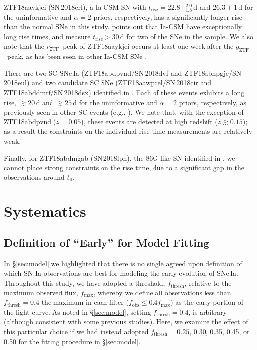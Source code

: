 \documentclass[twocolumn]{./aastex63}
\newcommand{\rztf}{$r_\mathrm{ZTF}$}
\newcommand{\gztf}{$g_\mathrm{ZTF}$}
\newcommand{\tfl}{$t_\mathrm{fl}$}
\newcommand{\trise}{$t_\mathrm{rise}$}
\begin{document}
ZTF18aaykjei (SN\,2018crl), a Ia-CSM SN with \trise$ = 22.8
\pm^{2.0}_{1.8}$\,d and $26.3 \pm 1$\,d for the uninformative and $\alpha = 2$
priors, respectively, has a significantly longer rise than the normal SNe in
this study. \citet{Silverman13} points out that Ia-CSM have exceptionally long
rise times, and \citet{Firth15} measure \trise$ > 30$\,d for two of the SNe in
the \citet{Silverman13} sample. We also note that the \rztf\ peak of
ZTF18aaykjei occurs at least one week after the \gztf\ peak, as has been seen
in other Ia-CSM SNe \citep{aldering05gj,prieto05gj}.

There are two SC SNe\,Ia (ZTF18abdpvnd/SN\,2018dvf and
ZTF18abhpgje/SN\,2018eul) and two candidate SC SNe (ZTF18aawpcel/SN\,2018cir
and ZTF18abddmrf/SN\,2018dsx) identified in \citet{Yao19}. Each of these
events exhibits a long rise, $\gtrsim 20$\,d and $\gtrsim 25$\,d for the
uninformative and $\alpha=2$ priors, respectively, as previously seen in other
SC events (e.g., \citealt{Scalzo10,Silverman11}). We note that, with the
exception of ZTF18abdpvnd ($z = 0.05$), these events are detected at high
redshift ($z \gtrsim 0.15$); as a result the constraints on the individual
rise time measurements are relatively weak.

Finally, for ZTF18abdmgab (SN\,2018lph), the 86G-like SN identified in
\citet{Yao19}, we cannot place strong constraints on the rise time, due to a
significant gap in the observations around \tfl.


\section{Systematics}\label{sec:systematics}

\subsection{Definition of ``Early'' for Model Fitting}\label{sec:flux_cut}

In \S\ref{sec:model} we highlighted that there is no single agreed upon
definition of which SN Ia observations are best for modeling the early
evolution of SNe\,Ia. Throughout this study, we have adopted a threshold,
$f_\mathrm{thresh}$, relative to the maximum observed flux, $f_\mathrm{max}$,
whereby we define all observations less than $f_\mathrm{thresh} = 0.4$ the
maximum in each filter ($f_\mathrm{obs} \leq 0.4f_\mathrm{max}$) as the early
portion of the light curve. As noted in \S\ref{sec:model}, setting
$f_\mathrm{thresh} = 0.4$, is arbitrary (although consistent with some
previous studies). Here, we examine the effect of this particular choice if we
had instead adopted $f_\mathrm{thresh} = 0.25$, 0.30, 0.35, 0.45, or 0.50 for
the fitting procedure in \S\ref{sec:model}.
\end{document}
